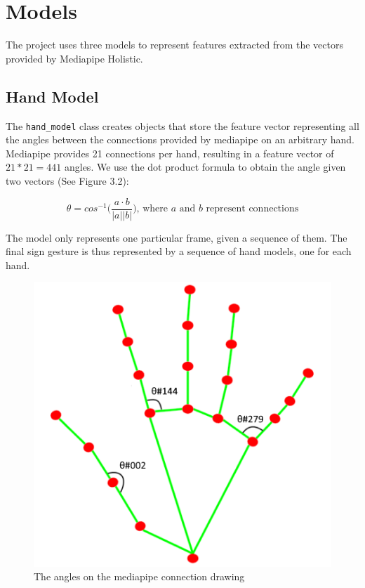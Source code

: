 \documentclass[final,rdr32.tex]{subfiles}
\begin{document}
\section{Models}
\label{sec:models}

The project uses three models to represent features extracted from the vectors provided by Mediapipe Holistic.

\subsection{Hand Model}
\label{sec:hand_model}

The \verb|hand_model| class creates objects that store the feature vector representing all the angles between the connections provided by mediapipe on an arbitrary hand. Mediapipe provides 21 connections per hand, resulting in a feature vector of $21 * 21 = 441$ angles. We use the dot product formula to obtain the angle given two vectors (See Figure 3.2):

\begin{equation*}
    \theta = cos^{-1}\Big(\frac{a \cdot b}{|a| |b|}\Big) \text{, where $a$ and $b$ represent connections}
\end{equation*}

The model only represents one particular frame, given a sequence of them. The final sign gesture is thus represented by a sequence of hand models, one for each hand.

\begin{figure}[H]
    \begin{center}
        \includegraphics[scale=0.7]{images/hand_landmarks.png}
        \caption{The angles on the mediapipe connection drawing}
    \end{center}
\end{figure}
\end{document}
